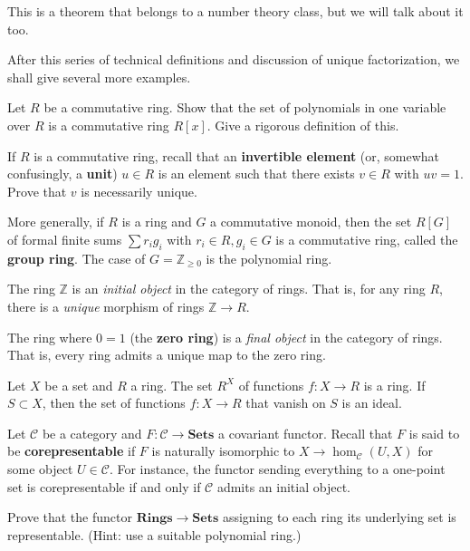 This is a theorem that belongs to a number theory class, but we will talk about
it too.

After this series of technical definitions and discussion of unique
factorization, we shall give several more examples.

\begin{exercise}\label{polynomial}
Let $R$ be a commutative ring. Show that the set of polynomials in one variable
over $R$ is a commutative ring $R[x]$. Give a rigorous definition of this.
\end{exercise}

\begin{exercise}
If $R$ is a commutative ring, recall that an \textbf{invertible element} (or,
somewhat confusingly, a \textbf{unit}) $u \in R$ is an element such that there
exists $v \in R$ with $uv = 1$. Prove that $v$ is necessarily unique.
\end{exercise}

\begin{exercise}
More generally, if $R$ is a ring and $G$ a commutative monoid, then the set
$R[G]$ of formal finite sums $\sum r_i g_i$ with $r_i \in R, g_i \in G$ is a
commutative ring, called the \textbf{group ring}. The case of $G =
\mathbb{Z}_{\geq 0}$ is the polynomial ring.
\end{exercise}

\begin{exercise} \label{integersinitial}
The ring $\mathbb{Z}$ is an \emph{initial object} in the category of rings.
That is, for any ring $R$, there is a \emph{unique} morphism of rings
$\mathbb{Z} \to R$.
\end{exercise}

\begin{exercise}
The ring where $0=1$ (the \textbf{zero ring}) is a \emph{final object} in the
category of rings. That is, every ring admits a unique map to the zero ring.
\end{exercise}

\begin{exercise}
Let $X$ be a set and $R$ a ring. The set $R^X$ of functions $f:X \to R$ is a
ring. If $S \subset X$, then the set of functions $f: X \to R$ that vanish on
$S$ is an ideal.
\end{exercise}

\begin{exercise} \label{corepresentable}
Let $\mathcal{C}$ be a category and $F: \mathcal{C} \to \mathbf{Sets}$ a
covariant functor. Recall that $F$ is said to be \textbf{corepresentable} if
$F$ is naturally isomorphic to $X \to \hom_{\mathcal{C}}(U, X)$ for some object
$U \in \mathcal{C}$. For instance, the functor sending everything to a
one-point set is corepresentable if and only if $\mathcal{C}$ admits an initial
object.

Prove that the functor $\mathbf{Rings} \to \mathbf{Sets}$ assigning to each
ring its underlying set is representable. (Hint: use a suitable polynomial
ring.)
\end{exercise}

